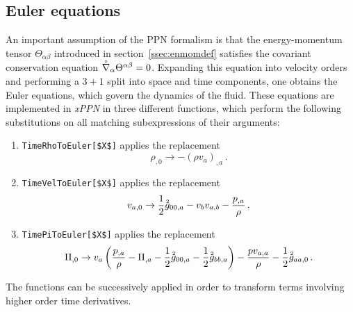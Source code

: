 \documentclass[notitlepage,a4paper,aps,prd,onecolumn,superscriptaddress,nofootinbib,groupedaddress,longbibliography]{revtex4-1}
\newcommand{\order}[2]{\accentset{#2}{#1}}
\newcommand{\lc}[1]{\accentset{\circ}{#1}}
\newcommand{\xPPN}{\emph{xPPN}}
\begin{document}
\subsection{Euler equations}\label{ssec:euler}
An important assumption of the PPN formalism is that the energy-momentum tensor \(\Theta_{\alpha\beta}\) introduced in section~\ref{ssec:enmomdef} satisfies the covariant conservation equation \(\lc{\nabla}_{\alpha}\Theta^{\alpha\beta} = 0\). Expanding this equation into velocity orders and performing a $3+1$ split into space and time components, one obtains the Euler equations, which govern the dynamics of the fluid. These equations are implemented in \xPPN{} in three different functions, which perform the following substitutions on all matching subexpressions of their arguments:
\begin{enumerate}
\item
\lstinline/TimeRhoToEuler[$X$]/ applies the replacement
\begin{equation}
\rho_{,0} \to -(\rho v_a)_{,a}\,.
\end{equation}

\item
\lstinline/TimeVelToEuler[$X$]/ applies the replacement
\begin{equation}
v_{a,0} \to \frac{1}{2}\order{g}{2}_{00,a} - v_bv_{a,b} - \frac{p_{,a}}{\rho}\,.
\end{equation}

\item
\lstinline/TimePiToEuler[$X$]/ applies the replacement
\begin{equation}
\Pi_{,0} \to v_a\left(\frac{p_{,a}}{\rho} - \Pi_{,a} - \frac{1}{2}\order{g}{2}_{00,a} - \frac{1}{2}\order{g}{2}_{bb,a}\right) - \frac{pv_{a,a}}{\rho} - \frac{1}{2}\order{g}{2}_{aa,0}\,.
\end{equation}
\end{enumerate}
The functions can be successively applied in order to transform terms involving higher order time derivatives.
\end{document}
